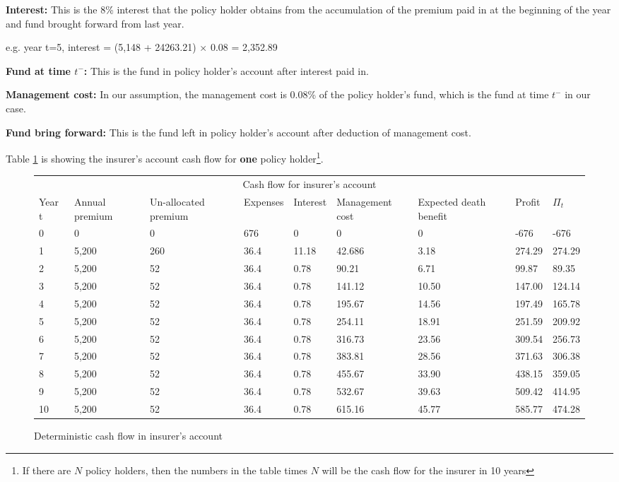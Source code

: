 \documentclass{report}
\begin{document}
\textbf{Interest:} This is the 8\% interest that the policy holder obtains from the accumulation of the premium paid in at the beginning of the year and fund brought forward from last year.

e.g.  year t=5, interest = (5,148 + 24263.21) $\times$ 0.08 = 2,352.89

\textbf{Fund at time $t^-$:} This is the fund in policy holder's account after interest paid in.

\textbf{Management cost:} In our assumption, the management cost is 0.08\% of the policy holder's fund, which is the fund at time $t^-$ in our case. 

\textbf{Fund bring forward:} This is the fund left in policy holder's account after deduction of management cost. 


Table \ref{determ-insurer} is showing the insurer's account cash flow for \textbf{one} policy holder\footnote{If there are $N$ policy holders, then the numbers in the table times $N$ will be the cash flow for the insurer in 10 years}. 


\begin{figure}[H]
\hfill
\begin{tabular}{p{0.8cm} p{1.5cm} p{1.5cm} p{1.2cm} p{1cm} p{2cm}p{1.5cm} p{1.5cm} p{1.5cm} }
\toprule
\multicolumn{9}{c}{Cash flow for insurer's account} \\
\cmidrule(r){3-7}

Year t & Annual premium & Un-allocated premium & Expenses & Interest &Management cost& Expected death benefit & Profit& $\Pi_t$  \\
\midrule

0&0&0&676&0&0&0&-676&-676\\
1&5,200&260&36.4&11.18&42.686&3.18&274.29&274.29\\
2&5,200&52&36.4&0.78&90.21&6.71&99.87&89.35\\
3&5,200&52&36.4&0.78&141.12&10.50&147.00&124.14\\
4&5,200&52&36.4&0.78&195.67&14.56&197.49&165.78\\
5&5,200&52&36.4&0.78&254.11&18.91&251.59&209.92\\
6&5,200&52&36.4&0.78&316.73&23.56&309.54&256.73\\
7&5,200&52&36.4&0.78&383.81&28.56&371.63&306.38\\
8&5,200&52&36.4&0.78&455.67&33.90&438.15&359.05\\
9&5,200&52&36.4&0.78&532.67&39.63&509.42&414.95\\
10&5,200&52&36.4&0.78&615.16&45.77&585.77&474.28\\

\bottomrule
\end{tabular}
\caption{Deterministic cash flow in insurer's account}
\label{determ-insurer}
\end{figure}
\end{document}
